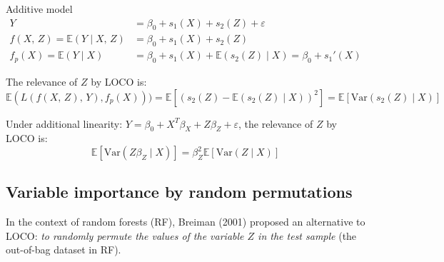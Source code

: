 \begin{example}{Additive model}{}
    \begin{align*}
        Y &= \beta_0 + s_1(X) + s_2(Z) + \varepsilon \\[0.5em]
        f(X,\,Z) = \mathds{E}(Y \mid X,\,Z) &= \beta_0 + s_1(X) + s_2(Z) \\
        f_p(X) = \mathds{E}(Y \mid X) &= \beta_0 + s_1(X) + \mathds{E}(s_2(Z) \mid X)
            = \beta_0 + s_1'(X)
    \end{align*}

    The relevance of $Z$ by LOCO is:
    \begin{equation*}
        \mathds{E}(L(f(X,\,Z),\,Y),f_p(X))) = \mathds{E} \left[ (s_2(Z) - \mathds{E}(s_2(Z) \mid X))^2 \right]
        = \mathds{E} \left[ \text{Var}(s_2(Z) \mid X)\right]
    \end{equation*}

    \tcbline

    Under additional linearity: $Y = \beta_0 + X^T\beta_X + Z\beta_Z + \varepsilon$,
    the relevance of $Z$ by LOCO is:
    \begin{equation*}
        \mathds{E}\left[ \text{Var}(Z \beta_Z \mid X)\right] = \beta_Z^2 \mathds{E}\left[ \text{Var}(Z \mid X)\right]
    \end{equation*}
\end{example}


\subsection{Variable importance by random permutations}

In the context of random forests (RF), Breiman (2001) proposed an
alternative to LOCO:
\emph{to randomly permute the values of the variable $Z$ in the test sample}
(the out-of-bag dataset in RF).

